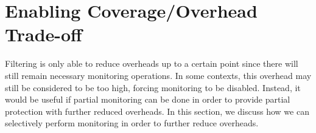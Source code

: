 \section{Enabling Coverage/Overhead Trade-off}
\label{sec:drop}

Filtering is only able to reduce overheads up to a certain point since there will still remain necessary monitoring operations. In some
contexts, this overhead may still be considered to be too high, forcing
monitoring to be disabled. Instead, it would be useful if partial monitoring
can be done in order to provide partial protection with further reduced
overheads. In this
section, we discuss how we can selectively perform monitoring in order to
further reduce overheads.

\begin{figure}
  \begin{center}

\end{center}
\end{figure}
